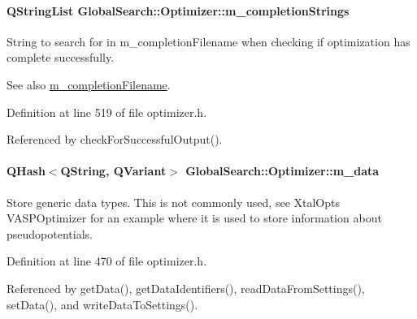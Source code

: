 \paragraph[{m\+\_\+completion\+Strings}]{\setlength{\rightskip}{0pt plus 5cm}Q\+String\+List Global\+Search\+::\+Optimizer\+::m\+\_\+completion\+Strings\hspace{0.3cm}{\ttfamily [protected]}}\label{classGlobalSearch_1_1Optimizer_a65ee33ee8778c366e8b197e75ae8e674}
String to search for in m\+\_\+completion\+Filename when checking if optimization has complete successfully. \begin{DoxySeeAlso}{See also}
\hyperlink{classGlobalSearch_1_1Optimizer_a5e7a476823bc2d4b63939a9ada4f8ed0}{m\+\_\+completion\+Filename}. 
\end{DoxySeeAlso}


Definition at line 519 of file optimizer.\+h.



Referenced by check\+For\+Successful\+Output().

\hypertarget{classGlobalSearch_1_1Optimizer_a5cf732e34a6eaa4a7b1781d23e6e1c6e}{}
\paragraph[{m\+\_\+data}]{\setlength{\rightskip}{0pt plus 5cm}Q\+Hash$<$Q\+String, Q\+Variant$>$ Global\+Search\+::\+Optimizer\+::m\+\_\+data\hspace{0.3cm}{\ttfamily [protected]}}\label{classGlobalSearch_1_1Optimizer_a5cf732e34a6eaa4a7b1781d23e6e1c6e}
Store generic data types. This is not commonly used, see Xtal\+Opt\textquotesingle{}s V\+A\+S\+P\+Optimizer for an example where it is used to store information about pseudopotentials. 

Definition at line 470 of file optimizer.\+h.



Referenced by get\+Data(), get\+Data\+Identifiers(), read\+Data\+From\+Settings(), set\+Data(), and write\+Data\+To\+Settings().

\hypertarget{classGlobalSearch_1_1Optimizer_a4d2dc8b7aaa3bb6fed8c28547460def8}{}
